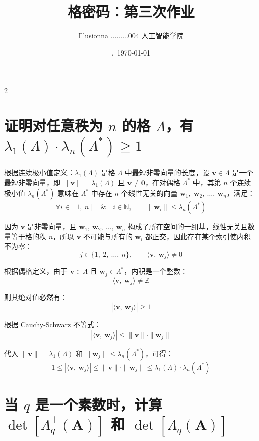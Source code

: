 \documentclass{article}
\title{格密码：第三次作业}
\author{Illusionna \quad 2025.........004 \quad 人工智能学院}
\date{\currenttime,\ \today}
\begin{document}
\maketitle
\thispagestyle{empty}
\begin{spacing}{2}
    \tableofcontents
\end{spacing}
\thispagestyle{empty}
\clearpage
\setcounter{page}{1}



\section{证明对任意秩为 $n$ 的格 $\Lambda$，有 $\lambda_1(\Lambda)\cdot\lambda_n(\Lambda^{*})\geqslant1$}

根据连续极小值定义：$\lambda_1(\Lambda)$ 是格 $\Lambda$ 中最短非零向量的长度，设 $\bm{v}\in\Lambda$ 是一个最短非零向量，即 $\|\bm{v}\|=\lambda_1(\Lambda)$ 且 $\bm{v}\neq\bm{0}$，在对偶格 $\Lambda^{*}$ 中，其第 $n$ 个连续极小值 $\lambda_n(\Lambda^{*})$ 意味在 $\Lambda^{*}$ 中存在 $n$ 个线性无关的向量 $\bm{w}_1,\ \bm{w}_2,\ \ldots,\ \bm{w}_n$，满足：
\[ \forall i\in[1,\ n]\quad\&\quad i\in\mathbb{N},\qquad \|\bm{w}_i\|\leqslant\lambda_n(\Lambda^{*}) \]

因为 $\bm{v}$ 是非零向量，且 $\bm{w}_1,\ \bm{w}_2,\ \ldots,\ \bm{w}_n$ 构成了所在空间的一组基，线性无关且数量等于格的秩 $n$，所以 $\bm{v}$ 不可能与所有的 $\bm{w}_i$ 都正交，因此存在某个索引使内积不为零：
\[ j\in\{1,\ 2,\ \ldots,\ n\},\qquad \langle\bm{v},\ \bm{w}_j\rangle\neq0 \]

根据偶格定义，由于 $\bm{v}\in\Lambda$ 且 $\bm{w}_j\in\Lambda^{*}$，内积是一个整数：
\[ \langle\bm{v},\ \bm{w}_j\rangle\neq\mathbb{Z} \]

则其绝对值必然有：
\[ \left\lvert\langle\bm{v},\ \bm{w}_j\rangle\right\rvert\geqslant1  \]

根据 Cauchy-Schwarz 不等式：
\[ \left\lvert\langle\bm{v},\ \bm{w}_j\rangle\right\rvert\leqslant\|\bm{v}\|\cdot\|\bm{w}_j\| \]

代入 $\|\bm{v}\|=\lambda_1(\Lambda)$ 和 $\|\bm{w}_j\|\leqslant\lambda_n(\Lambda^{*})$，可得：
\[ 1\leqslant\left\lvert\langle\bm{v},\ \bm{w}_j\rangle\right\rvert\leqslant\|\bm{v}\|\cdot\|\bm{w}_j\|\leqslant\lambda_1(\Lambda)\cdot\lambda_n(\Lambda^{*}) \]



\section{当 $q$ 是一个素数时，计算 $\det\left[\Lambda_{q}^{\perp}\left(\bm{A}\right)\right]$ 和 $\det\left[\Lambda_{q}\left(\bm{A}\right)\right]$}
\end{document}
